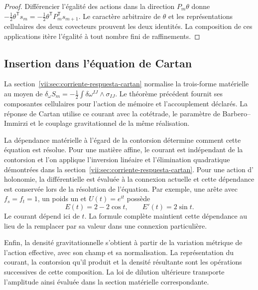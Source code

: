 \begin{proof}
Différencier l'égalité des actions dans la direction
\(P_m\theta\) donne
\(-\tfrac12\theta^{\mathsf T}s_m
 =-\tfrac12\theta^{\mathsf T}P_m^{\mathsf T}s_{m+1}\).
Le caractère arbitraire de \(\theta\) et les représentations cellulaires
des deux covecteurs prouvent les deux identités. La composition de
ces applications itère l'égalité à tout nombre fini de raffinements.
\end{proof}

\subsection{Insertion dans l'équation de Cartan}

La section~\ref{vii:sec:corriente-respuesta-cartan} normalise la trois-forme matérielle au moyen de \(\delta_\omega S_m=-\tfrac12\int\delta\omega^{IJ}\wedge
\sigma_{IJ}\). Le théorème précédent fournit ses composantes cellulaires pour l'action de mémoire et l'accouplement déclarés. La réponse de Cartan utilise ce courant avec la cotétrade, le paramètre de Barbero--Immirzi et le couplage gravitationnel de la même réalisation.

La dépendance matérielle à l'égard de la contorsion détermine comment
cette équation est résolue. Pour une matière affine, le courant est indépendant
de la contorsion et l'on applique l'inversion linéaire et l'élimination
quadratique démontrées dans la section~\ref{vii:sec:corriente-respuesta-cartan}.
Pour une action d'
holonomie, la différentielle est évaluée à la connexion actuelle et cette dépendance
est conservée lors de la résolution de l'équation. Par exemple, une arête avec
\(f_s=f_t=1\), un poids un et \(U(t)=e^{it}\) possède
\[
 E(t)=2-2\cos t,\qquad E'(t)=2\sin t.
\]
Le courant dépend ici de \(t\). La formule complète maintient
cette dépendance au lieu de la remplacer par sa valeur dans une connexion
particulière.

Enfin, la densité gravitationnelle s'obtient à partir de la variation
métrique de l'action effective, avec son champ et sa normalisation.
La représentation du courant, la contorsion qu'il produit et la
densité résultante sont les opérations successives de cette composition.
La loi de dilution ultérieure transporte l'amplitude ainsi évaluée dans
la section matérielle correspondante.
